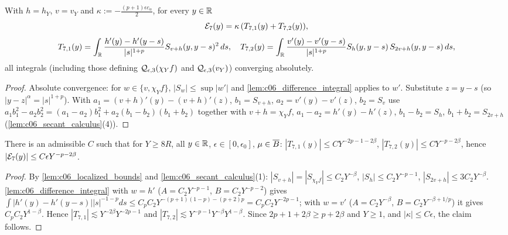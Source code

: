 \begin{lemma}
  \label{lem:c06_E7_decomposition}
  With $h=h_Y$, $v=v_Y$ and $\kappa:=-\frac{(p+1)\epsilon c_\alpha}2$, for every $y\in\mathbb{R}$
  \[\mathcal{E}_7(y)=\kappa\,(T_{7,1}(y)+T_{7,2}(y)),\]
  \[T_{7,1}(y)=\int_{\mathbb{R}}\frac{h'(y)-h'(y-s)}{|s|^{1+p}}S_{v+h}(y,y-s)^2\,ds,\quad
    T_{7,2}(y)=\int_{\mathbb{R}}\frac{v'(y)-v'(y-s)}{|s|^{1+p}}S_h(y,y-s)\,S_{2v+h}(y,y-s)\,ds,\]
  all integrals (including those defining $\mathcal{Q}_{\epsilon,3}(\chi_Yf)$ and $\mathcal{Q}_{\epsilon,3}(v_Y)$) converging absolutely.
\end{lemma}
\begin{proof}
  Absolute convergence: for $w\in\{v,\chi_Yf\}$, $|S_w|\le\sup|w'|$ and
  \cref{lem:c06_difference_integral} applies to $w'$. Substitute $z=y-s$ (so $|y-z|^\alpha=|s|^{1+p}$).
  With $a_1=(v+h)'(y)-(v+h)'(z)$, $b_1=S_{v+h}$, $a_2=v'(y)-v'(z)$, $b_2=S_v$ use
  $a_1b_1^2-a_2b_2^2=(a_1-a_2)b_1^2+a_2(b_1-b_2)(b_1+b_2)$ together with $v+h=\chi_Yf$,
  $a_1-a_2=h'(y)-h'(z)$, $b_1-b_2=S_h$, $b_1+b_2=S_{2v+h}$ (\cref{lem:c06_secant_calculus}(4)).
\end{proof}

\begin{lemma}[Size of $\mc E_7$]
  \label{lem:c06_E7_value}
  There is an admissible $C$ such that for $Y\ge8R$, all $y\in\mathbb{R}$, $\epsilon\in[0,\epsilon_0]$, $\mu\in\overline{B}$:
  $|T_{7,1}(y)|\le CY^{-2p-1-2\beta}$, $|T_{7,2}(y)|\le CY^{-p-2\beta}$, hence
  $|\mathcal{E}_7(y)|\le C\epsilon Y^{-p-2\beta}$.
\end{lemma}
\begin{proof}
  By \cref{lem:c06_localized_bounds} and \cref{lem:c06_secant_calculus}(1):
  $|S_{v+h}|=|S_{\chi_Yf}|\le C_2Y^{-\beta}$, $|S_h|\le C_2Y^{-p-1}$, $|S_{2v+h}|\le3C_2Y^{-\beta}$.
  \cref{lem:c06_difference_integral} with $w=h'$ ($A=C_2Y^{-p-1}$, $B=C_2Y^{-p-2}$) gives
  $\int|h'(y)-h'(y-s)||s|^{-1-p}ds\le C_pC_2Y^{-(p+1)(1-p)-(p+2)p}=C_pC_2Y^{-2p-1}$; with $w=v'$
  ($A=C_2Y^{-\beta}$, $B=C_2Y^{-\beta+1/p}$) it gives $C_pC_2Y^{1-\beta}$.
  Hence $|T_{7,1}|\lesssim Y^{-2\beta}Y^{-2p-1}$ and $|T_{7,2}|\lesssim Y^{-p-1}Y^{-\beta}Y^{1-\beta}$.
  Since $2p+1+2\beta\ge p+2\beta$ and $Y\ge1$, and $|\kappa|\le C\epsilon$, the claim follows.
\end{proof}

